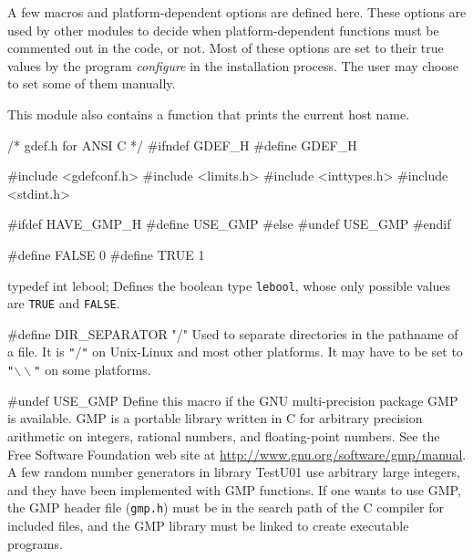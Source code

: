 
A few macros and platform-dependent options are defined here.
These options are used by other modules to decide when 
platform-dependent functions must be commented out in the code, or not.
Most of these options are set to their true values by the program
{\it configure} in the installation process. The user may choose
to set some of them manually.
\iffalse
Each option must either be left undefined (i.e., the corresponding
macro is put to false, using ``\texttt{\#undef}) 
or can be given its proper value (using ``\texttt{\#define} commands).
An option can be defined only under certain conditions.
For example, \texttt{USE\_GMP} can be defined only if GMP
is available, \texttt{HAVE\_ERF} can be defined only if the Unix \texttt{erf}
function is available, and so on.
\fi
This module also contains a function that prints the current host name.

\code\hide
/* gdef.h  for ANSI C */
#ifndef GDEF_H
#define GDEF_H

#include <gdefconf.h>
#include <limits.h>
#include <inttypes.h>
#include <stdint.h>

#ifdef HAVE_GMP_H
#define USE_GMP
#else
#undef USE_GMP
#endif
\endhide
\endcode


\code
#define FALSE 0
#define TRUE 1

typedef int lebool;
\endcode
  \tab Defines the boolean type \texttt{lebool}, whose only possible values are
  {\tt TRUE} and {\tt FALSE}.
 \endtab
\code

#define DIR_SEPARATOR "/"
\endcode
  \tab Used to separate directories in the pathname of a file.
  It is \texttt{"$/$"} on {Unix-Linux} and most other platforms. 
  It may have to be set to \texttt{"$\backslash\backslash$"} on some platforms.
 \endtab
\code


#undef USE_GMP
\endcode
  \tab  Define this macro if the GNU multi-precision package GMP
  is available.  GMP is a portable library written in C for arbitrary
  precision arithmetic on integers, rational numbers, and floating-point
  numbers. See the Free Software Foundation web site at
  \url{http://www.gnu.org/software/gmp/manual}. A few random number
  generators in library TestU01 use arbitrary large integers, and they
  have been implemented with GMP functions. If one wants to use GMP, the
  GMP header file (\texttt{gmp.h}) must be in the  search path 
  of the C compiler for included files, and the GMP library must be 
  linked to create executable programs.
 \endtab
\iffalse   %
\code

